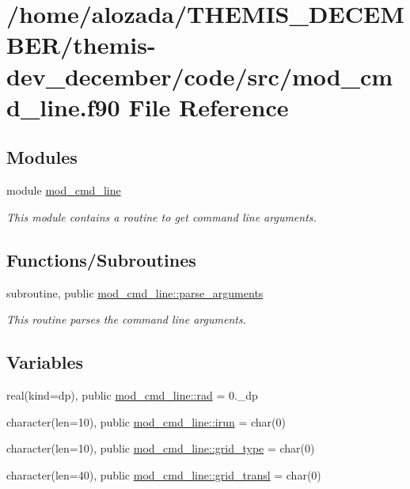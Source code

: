 \hypertarget{mod__cmd__line_8f90}{}\section{/home/alozada/\+T\+H\+E\+M\+I\+S\+\_\+\+D\+E\+C\+E\+M\+B\+E\+R/themis-\/dev\+\_\+december/code/src/mod\+\_\+cmd\+\_\+line.f90 File Reference}
\label{mod__cmd__line_8f90}
\subsection*{Modules}
\begin{DoxyCompactItemize}
\item 
module \hyperlink{namespacemod__cmd__line}{mod\+\_\+cmd\+\_\+line}
\begin{DoxyCompactList}\small\item\em This module contains a routine to get command line arguments. \end{DoxyCompactList}\end{DoxyCompactItemize}
\subsection*{Functions/\+Subroutines}
\begin{DoxyCompactItemize}
\item 
subroutine, public \hyperlink{namespacemod__cmd__line_a2869d8f148b9b3ad22cf98c7ac4fcc40}{mod\+\_\+cmd\+\_\+line\+::parse\+\_\+arguments}
\begin{DoxyCompactList}\small\item\em This routine parses the command line arguments. \end{DoxyCompactList}\end{DoxyCompactItemize}
\subsection*{Variables}
\begin{DoxyCompactItemize}
\item 
real(kind=dp), public \hyperlink{namespacemod__cmd__line_aaec5fd5d1bccfc9f5d40a72568188667}{mod\+\_\+cmd\+\_\+line\+::rad} = 0.\+\_\+dp
\item 
character(len=10), public \hyperlink{namespacemod__cmd__line_ae265e832b5cdb62595a1e0c2339c7e80}{mod\+\_\+cmd\+\_\+line\+::irun} = char(0)
\item 
character(len=10), public \hyperlink{namespacemod__cmd__line_a8395cb7a13a767c9f0b8e4d6b0b5bbbe}{mod\+\_\+cmd\+\_\+line\+::grid\+\_\+type} = char(0)
\item 
character(len=40), public \hyperlink{namespacemod__cmd__line_a63a7d7fabb7e0819c6f88e792f327d80}{mod\+\_\+cmd\+\_\+line\+::grid\+\_\+transl} = char(0)
\end{DoxyCompactItemize}
